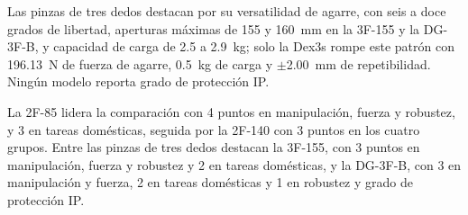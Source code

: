 Las pinzas de tres dedos destacan por su versatilidad de agarre, con seis a doce grados de libertad, aperturas máximas de 155 y 160~mm en la 3F-155 y la DG-3F-B, y capacidad de carga de 2.5 a 2.9~kg; solo la Dex3s rompe este patrón con 196.13~N de fuerza de agarre, 0.5~kg de carga y $\pm$2.00~mm de repetibilidad. Ningún modelo reporta grado de protección IP.

La 2F-85 lidera la comparación con 4 puntos en manipulación, fuerza y robustez, y 3 en tareas domésticas, seguida por la 2F-140 con 3 puntos en los cuatro grupos. Entre las pinzas de tres dedos destacan la 3F-155, con 3 puntos en manipulación, fuerza y robustez y 2 en tareas domésticas, y la DG-3F-B, con 3 en manipulación y fuerza, 2 en tareas domésticas y 1 en robustez y grado de protección IP.

